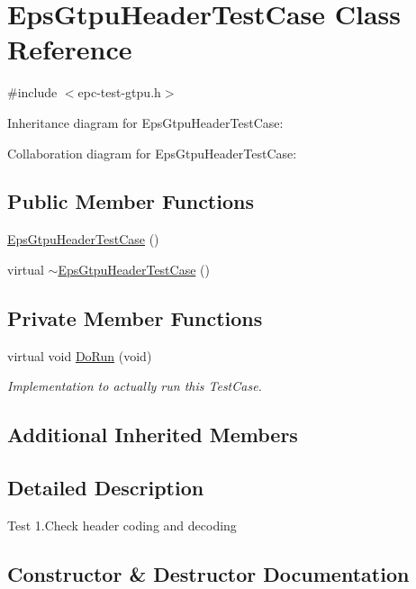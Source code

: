 \hypertarget{classEpsGtpuHeaderTestCase}{}\section{Eps\+Gtpu\+Header\+Test\+Case Class Reference}
\label{classEpsGtpuHeaderTestCase}


{\ttfamily \#include $<$epc-\/test-\/gtpu.\+h$>$}



Inheritance diagram for Eps\+Gtpu\+Header\+Test\+Case\+:


Collaboration diagram for Eps\+Gtpu\+Header\+Test\+Case\+:
\subsection*{Public Member Functions}
\begin{DoxyCompactItemize}
\item 
\hyperlink{classEpsGtpuHeaderTestCase_af516b0cf4058662be68789efefe834bc}{Eps\+Gtpu\+Header\+Test\+Case} ()
\item 
virtual \hyperlink{classEpsGtpuHeaderTestCase_ad614a04c77589df71240e696f3f4ceb6}{$\sim$\+Eps\+Gtpu\+Header\+Test\+Case} ()
\end{DoxyCompactItemize}
\subsection*{Private Member Functions}
\begin{DoxyCompactItemize}
\item 
virtual void \hyperlink{classEpsGtpuHeaderTestCase_a49e06b747dc8a930183a544e2050034e}{Do\+Run} (void)
\begin{DoxyCompactList}\small\item\em Implementation to actually run this Test\+Case. \end{DoxyCompactList}\end{DoxyCompactItemize}
\subsection*{Additional Inherited Members}


\subsection{Detailed Description}
Test 1.\+Check header coding and decoding 

\subsection{Constructor \& Destructor Documentation}
